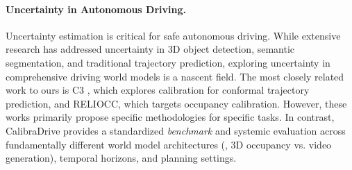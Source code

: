 \paragraph{Uncertainty in Autonomous Driving.}
Uncertainty estimation is critical for safe autonomous driving. While extensive research has addressed uncertainty in 3D object detection, semantic segmentation, and traditional trajectory prediction, exploring uncertainty in comprehensive driving world models is a nascent field. The most closely related work to ours is C3 \cite{mei2025c3}, which explores calibration for conformal trajectory prediction, and RELIOCC, which targets occupancy calibration. However, these works primarily propose specific methodologies for specific tasks. In contrast, CalibraDrive provides a standardized \textit{benchmark} and systemic evaluation across fundamentally different world model architectures (\eg, 3D occupancy vs. video generation), temporal horizons, and planning settings.
